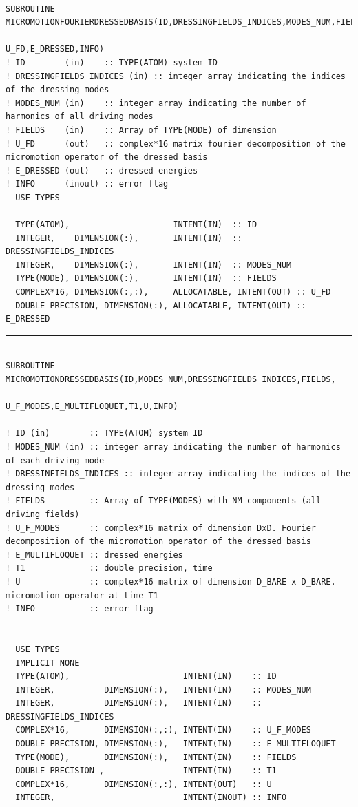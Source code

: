 \documentclass[10pt,a4paper]{article}
\begin{document}
\begin{verbatim}

SUBROUTINE MICROMOTIONFOURIERDRESSEDBASIS(ID,DRESSINGFIELDS_INDICES,MODES_NUM,FIELDS, 
                                                                      U_FD,E_DRESSED,INFO)
! ID        (in)    :: TYPE(ATOM) system ID
! DRESSINGFIELDS_INDICES (in) :: integer array indicating the indices of the dressing modes
! MODES_NUM (in)    :: integer array indicating the number of harmonics of all driving modes 
! FIELDS    (in)    :: Array of TYPE(MODE) of dimension 
! U_FD      (out)   :: complex*16 matrix fourier decomposition of the micromotion operator of the dressed basis
! E_DRESSED (out)   :: dressed energies
! INFO      (inout) :: error flag
  USE TYPES

  TYPE(ATOM),                     INTENT(IN)  :: ID
  INTEGER,    DIMENSION(:),       INTENT(IN)  :: DRESSINGFIELDS_INDICES
  INTEGER,    DIMENSION(:),       INTENT(IN)  :: MODES_NUM
  TYPE(MODE), DIMENSION(:),       INTENT(IN)  :: FIELDS
  COMPLEX*16, DIMENSION(:,:),     ALLOCATABLE, INTENT(OUT) :: U_FD
  DOUBLE PRECISION, DIMENSION(:), ALLOCATABLE, INTENT(OUT) :: E_DRESSED

\end{verbatim}
\begin{center}
\rule{12cm}{1pt}
\end{center}
\begin{verbatim}

SUBROUTINE MICROMOTIONDRESSEDBASIS(ID,MODES_NUM,DRESSINGFIELDS_INDICES,FIELDS,
                                                       U_F_MODES,E_MULTIFLOQUET,T1,U,INFO) 

! ID (in)        :: TYPE(ATOM) system ID
! MODES_NUM (in) :: integer array indicating the number of harmonics of each driving mode
! DRESSINFIELDS_INDICES :: integer array indicating the indices of the dressing modes
! FIELDS         :: Array of TYPE(MODES) with NM components (all driving fields)
! U_F_MODES      :: complex*16 matrix of dimension DxD. Fourier decomposition of the micromotion operator of the dressed basis
! E_MULTIFLOQUET :: dressed energies
! T1             :: double precision, time
! U              :: complex*16 matrix of dimension D_BARE x D_BARE. micromotion operator at time T1
! INFO           :: error flag


  USE TYPES
  IMPLICIT NONE
  TYPE(ATOM),                       INTENT(IN)    :: ID
  INTEGER,          DIMENSION(:),   INTENT(IN)    :: MODES_NUM
  INTEGER,          DIMENSION(:),   INTENT(IN)    :: DRESSINGFIELDS_INDICES
  COMPLEX*16,       DIMENSION(:,:), INTENT(IN)    :: U_F_MODES
  DOUBLE PRECISION, DIMENSION(:),   INTENT(IN)    :: E_MULTIFLOQUET
  TYPE(MODE),       DIMENSION(:),   INTENT(IN)    :: FIELDS
  DOUBLE PRECISION ,                INTENT(IN)    :: T1
  COMPLEX*16,       DIMENSION(:,:), INTENT(OUT)   :: U
  INTEGER,                          INTENT(INOUT) :: INFO

\end{verbatim}
\end{document}
